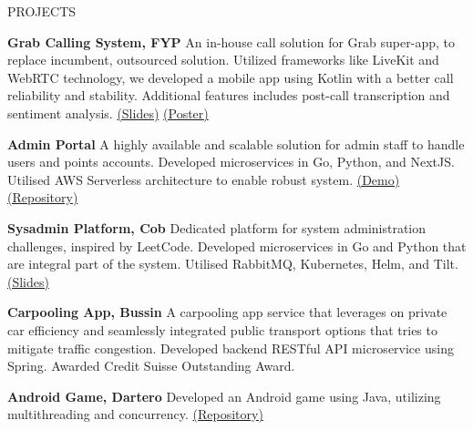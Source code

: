 \documentclass{resume} %
\begin{document}

\begin{rSection}{PROJECTS}
\vspace{-1.25em}

\item \textbf{Grab Calling System, FYP} {An in-house call solution for Grab super-app, to replace incumbent, outsourced solution. Utilized frameworks like LiveKit and WebRTC technology, we developed a mobile app using Kotlin with a better call reliability and stability. Additional features includes post-call transcription and sentiment analysis.
\href{https://drive.google.com/file/d/1y8UnuO__RFND29A64KiiEDGlcCrKM5JP/view?usp=sharing}{(Slides)} \href{https://drive.google.com/file/d/1GAYOGzGXRzd9tYW05xrRtNEaxdWrBHqD/view?usp=sharing}{(Poster)}}

\item \textbf{Admin Portal} {A highly available and scalable solution for admin staff to handle users and points accounts. Developed microservices in Go, Python, and NextJS. Utilised AWS Serverless architecture to enable robust system.
\href{https://drive.google.com/file/d/1oLYaHGlfMH5x33raus1Ed0TU9uiwzNIl/view?usp=share_link}{(Demo)} \href{https://github.com/cs301-2023-g3t3}{(Repository)}}

\item \textbf{Sysadmin Platform, Cob} {Dedicated platform for system administration challenges, inspired by LeetCode. Developed microservices in Go and Python that are integral part of the system. Utilised RabbitMQ, Kubernetes, Helm, and Tilt. \href{https://drive.google.com/file/d/1tmAqFLv3bauuZyU5m-ULxpX706uy0BL6/view?usp=share_link}{(Slides)}}

\item \textbf{Carpooling App, Bussin} {A carpooling app service that leverages on private car efficiency and seamlessly integrated public transport options that tries to mitigate traffic congestion. Developed backend RESTful API microservice using Spring. Awarded Credit Suisse Outstanding Award.}

\item \textbf{Android Game, Dartero} {Developed an Android game using Java, utilizing multithreading and concurrency. \href{https://github.com/DarteroGame/Dartero}{(Repository)}}
\end{rSection}
\end{document}
